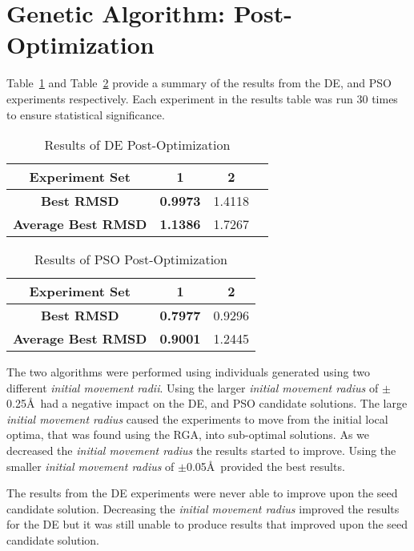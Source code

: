 \section{Genetic Algorithm: Post-Optimization}
\label{sec:post-op-analysis}

Table~\ref{table:post-op-de-results} and Table~\ref{table:post-op-pso-results} provide a summary of the results from the DE, and PSO experiments respectively. Each experiment in the results table was run 30 times to ensure statistical significance. 

\begin{table}
	\centering
	\begin{tabular}{ | >{\bfseries}c | c | c | c | }
		\hline
		Experiment Set & 1 & 2 \\ \hline
		Best RMSD & \textbf{0.9973} & 1.4118 \\ \hline
		Average Best RMSD & \textbf{1.1386} & 1.7267 \\ \hline
	\end{tabular}
	\caption{Results of DE Post-Optimization}
	\label{table:post-op-de-results}
\end{table}

\begin{table}
	\centering
	\begin{tabular}{ | >{\bfseries}c | c | c | }
		\hline
		Experiment Set & 1 & 2 \\ \hline
		Best RMSD & \textbf{0.7977} & 0.9296 \\ \hline
		Average Best RMSD & \textbf{0.9001} & 1.2445 \\ \hline
	\end{tabular}
	\caption{Results of PSO Post-Optimization}
	\label{table:post-op-pso-results}
\end{table}

The two algorithms were performed using individuals generated using two different \textit{initial movement radii}. Using the larger \textit{initial movement radius} of $\pm$0.25\AA\ had a negative impact on the DE, and PSO candidate solutions. The large \textit{initial movement radius} caused the experiments to move from the initial local optima, that was found using the RGA, into sub-optimal solutions. As we decreased the \textit{initial movement radius} the results started to improve. Using the smaller \textit{initial movement radius} of $\pm$0.05\AA\ provided the best results.

The results from the DE experiments were never able to improve upon the seed candidate solution. Decreasing the \textit{initial movement radius} improved the results for the DE but it was still unable to produce results that improved upon the seed candidate solution.


